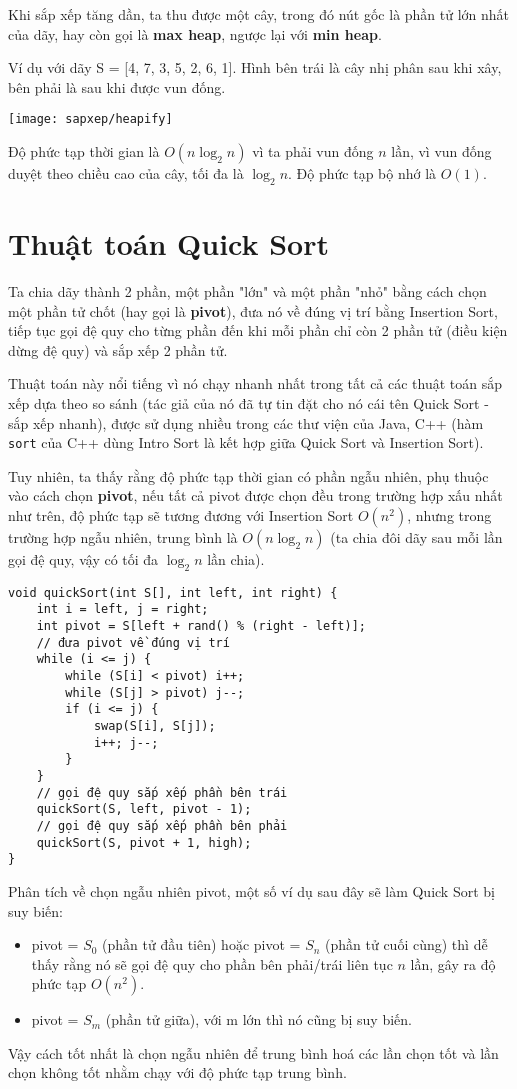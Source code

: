 Khi sắp xếp tăng dần, ta thu được một cây, trong đó nút gốc là phần tử lớn nhất của dãy, hay còn gọi là \textbf{max heap}, ngược lại với \textbf{min heap}.

Ví dụ với dãy S = [4, 7, 3, 5, 2, 6, 1]. Hình bên trái là cây nhị phân sau khi xây, bên phải là sau khi được vun đống.

\texttt{[image: sapxep/heapify]}

Độ phức tạp thời gian là $O(n\log_2n)$ vì ta phải vun đống $n$ lần, vì vun đống duyệt theo chiều cao của cây, tối đa là $\log_2n$. Độ phức tạp bộ nhớ là $O(1)$.

\section{Thuật toán Quick Sort}
Ta chia dãy thành 2 phần, một phần "lớn" và một phần "nhỏ" bằng cách chọn một phần tử chốt (hay gọi là \textbf{pivot}), đưa nó về đúng vị trí bằng Insertion Sort, tiếp tục gọi đệ quy cho từng phần đến khi mỗi phần chỉ còn 2 phần tử (điều kiện dừng đệ quy) và sắp xếp 2 phần tử.

Thuật toán này nổi tiếng vì nó chạy nhanh nhất trong tất cả các thuật toán sắp xếp dựa theo so sánh (tác giả của nó đã tự tin đặt cho nó cái tên Quick Sort - sắp xếp nhanh), được sử dụng nhiều trong các thư viện của Java, C++ (hàm \texttt{sort} của C++ dùng Intro Sort là kết hợp giữa Quick Sort và Insertion Sort).

Tuy nhiên, ta thấy rằng độ phức tạp thời gian có phần ngẫu nhiên, phụ thuộc vào cách chọn \textbf{pivot}, nếu tất cả pivot được chọn đều trong trường hợp xấu nhất như trên, độ phức tạp sẽ tương đương với Insertion Sort $O(n^2)$, nhưng trong trường hợp ngẫu nhiên, trung bình là $O(n\log_2n)$ (ta chia đôi dãy sau mỗi lần gọi đệ quy, vậy có tối đa $\log_2n$ lần chia).

\begin{verbatim}
void quickSort(int S[], int left, int right) {
    int i = left, j = right;
    int pivot = S[left + rand() % (right - left)];
    // đưa pivot về đúng vị trí
    while (i <= j) {
        while (S[i] < pivot) i++;
        while (S[j] > pivot) j--;
        if (i <= j) {
            swap(S[i], S[j]);
            i++; j--;
        }
    }
    // gọi đệ quy sắp xếp phần bên trái
    quickSort(S, left, pivot - 1);
    // gọi đệ quy sắp xếp phần bên phải
    quickSort(S, pivot + 1, high);
}
\end{verbatim}

Phân tích về chọn ngẫu nhiên pivot, một số ví dụ sau đây sẽ làm Quick Sort bị suy biến:
\begin{itemize}
    \item pivot = $S_0$ (phần tử đầu tiên) hoặc pivot = $S_n$ (phần tử cuối cùng) thì dễ thấy rằng nó sẽ gọi đệ quy cho phần bên phải/trái liên tục $n$ lần, gây ra độ phức tạp $O(n^2)$.
    \item pivot = $S_m$ (phần tử giữa), với m lớn thì nó cũng bị suy biến.
\end{itemize}
Vậy cách tốt nhất là chọn ngẫu nhiên để trung bình hoá các lần chọn tốt và lần chọn không tốt nhằm chạy với độ phức tạp trung bình.

